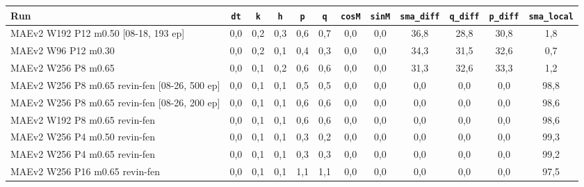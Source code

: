 \begin{tabular}{lccccccccccc}
\toprule
Run & \texttt{dt} & \texttt{k} & \texttt{h} & \texttt{p} & \texttt{q} & \texttt{cosM} & \texttt{sinM} & \texttt{sma\_diff} & \texttt{q\_diff} & \texttt{p\_diff} & \texttt{sma\_local} \\
\midrule
MAEv2 W192 P12 m0.50 [08-18, 193 ep] & 0,0 & 0,2 & 0,3 & 0,6 & 0,7 & 0,0 & 0,0 & 36,8 & 28,8 & 30,8 & 1,8 \\
MAEv2 W96 P12 m0.30 & 0,0 & 0,2 & 0,1 & 0,4 & 0,3 & 0,0 & 0,0 & 34,3 & 31,5 & 32,6 & 0,7 \\
MAEv2 W256 P8 m0.65 & 0,0 & 0,1 & 0,2 & 0,6 & 0,6 & 0,0 & 0,0 & 31,3 & 32,6 & 33,3 & 1,2 \\
MAEv2 W256 P8 m0.65 revin-fen [08-26, 500 ep] & 0,0 & 0,1 & 0,1 & 0,5 & 0,5 & 0,0 & 0,0 & 0,0 & 0,0 & 0,0 & 98,8 \\
MAEv2 W256 P8 m0.65 revin-fen [08-26, 200 ep] & 0,0 & 0,1 & 0,1 & 0,6 & 0,6 & 0,0 & 0,0 & 0,0 & 0,0 & 0,0 & 98,6 \\
MAEv2 W192 P8 m0.65 revin-fen & 0,0 & 0,1 & 0,1 & 0,6 & 0,6 & 0,0 & 0,0 & 0,0 & 0,0 & 0,0 & 98,6 \\
MAEv2 W256 P4 m0.50 revin-fen & 0,0 & 0,1 & 0,1 & 0,3 & 0,2 & 0,0 & 0,0 & 0,0 & 0,0 & 0,0 & 99,3 \\
MAEv2 W256 P4 m0.65 revin-fen & 0,0 & 0,1 & 0,1 & 0,3 & 0,3 & 0,0 & 0,0 & 0,0 & 0,0 & 0,0 & 99,2 \\
MAEv2 W256 P16 m0.65 revin-fen & 0,0 & 0,1 & 0,1 & 1,1 & 1,1 & 0,0 & 0,0 & 0,0 & 0,0 & 0,0 & 97,5 \\
\bottomrule
\end{tabular}
